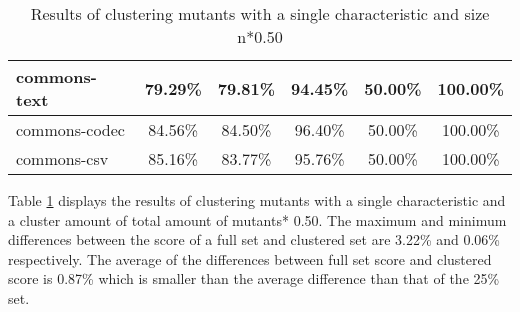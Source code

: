 \documentclass[../main]{subfiles}
\begin{document}
\begin{table}[!htb]
\begin{tabular}{|l|c|c|c|c|c|}
commons-text                  & 79.29\%                                                                                 & 79.81\%                                                                                     & 94.45\%                                                                              & 50.00\%                                                                               & 100.00\%                                                                             \\ \hline
commons-codec                 & 84.56\%                                                                                 & 84.50\%                                                                                     & 96.40\%                                                                              & 50.00\%                                                                               & 100.00\%                                                                             \\ \hline
commons-csv                   & 85.16\%                                                                                 & 83.77\%                                                                                     & 95.76\%                                                                              & 50.00\%                                                                               & 100.00\%                                                                             \\ \hline
\end{tabular}
\caption{\label{tab:clustering_single_50}Results of clustering mutants with a single characteristic and size n*0.50}
\end{table}
\FloatBarrier

Table \ref{tab:clustering_single_50} displays the results of clustering mutants with a single characteristic and a cluster amount of total amount of mutants* 0.50.  
The maximum and minimum differences between the score of a full set and clustered set are 3.22\% and 0.06\% respectively.
The average of the differences between full set score and clustered score is 0.87\% which is smaller than the average difference than that of the 25\% set.
\end{document}
